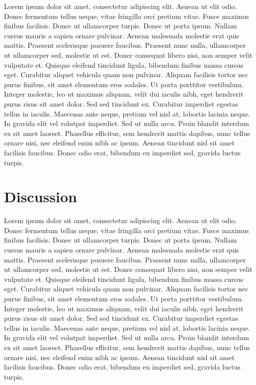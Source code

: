 \documentclass[Afour,times,sageh]{sagej}
\begin{document}
Lorem ipsum dolor sit amet, consectetur adipiscing elit. Aenean ut elit
odio. Donec fermentum tellus neque, vitae fringilla orci pretium vitae.
Fusce maximus finibus facilisis. Donec ut ullamcorper turpis. Donec ut
porta ipsum. Nullam cursus mauris a sapien ornare pulvinar. Aenean
malesuada molestie erat quis mattis. Praesent scelerisque posuere
faucibus. Praesent nunc nulla, ullamcorper ut ullamcorper sed, molestie
ut est. Donec consequat libero nisi, non semper velit vulputate et.
Quisque eleifend tincidunt ligula, bibendum finibus massa cursus eget.
Curabitur aliquet vehicula quam non pulvinar. Aliquam facilisis tortor
nec purus finibus, sit amet elementum eros sodales. Ut porta porttitor
vestibulum. Integer molestie, leo ut maximus aliquam, velit dui iaculis
nibh, eget hendrerit purus risus sit amet dolor. Sed sed tincidunt ex.
Curabitur imperdiet egestas tellus in iaculis. Maecenas ante neque,
pretium vel nisl at, lobortis lacinia neque. In gravida elit vel
volutpat imperdiet. Sed ut nulla arcu. Proin blandit interdum ex sit
amet laoreet. Phasellus efficitur, sem hendrerit mattis dapibus, nunc
tellus ornare nisi, nec eleifend enim nibh ac ipsum. Aenean tincidunt
nisl sit amet facilisis faucibus. Donec odio erat, bibendum eu imperdiet
sed, gravida luctus turpis.

\hypertarget{discussion}{%
\section{Discussion}\label{discussion}}

Lorem ipsum dolor sit amet, consectetur adipiscing elit. Aenean ut elit
odio. Donec fermentum tellus neque, vitae fringilla orci pretium vitae.
Fusce maximus finibus facilisis. Donec ut ullamcorper turpis. Donec ut
porta ipsum. Nullam cursus mauris a sapien ornare pulvinar. Aenean
malesuada molestie erat quis mattis. Praesent scelerisque posuere
faucibus. Praesent nunc nulla, ullamcorper ut ullamcorper sed, molestie
ut est. Donec consequat libero nisi, non semper velit vulputate et.
Quisque eleifend tincidunt ligula, bibendum finibus massa cursus eget.
Curabitur aliquet vehicula quam non pulvinar. Aliquam facilisis tortor
nec purus finibus, sit amet elementum eros sodales. Ut porta porttitor
vestibulum. Integer molestie, leo ut maximus aliquam, velit dui iaculis
nibh, eget hendrerit purus risus sit amet dolor. Sed sed tincidunt ex.
Curabitur imperdiet egestas tellus in iaculis. Maecenas ante neque,
pretium vel nisl at, lobortis lacinia neque. In gravida elit vel
volutpat imperdiet. Sed ut nulla arcu. Proin blandit interdum ex sit
amet laoreet. Phasellus efficitur, sem hendrerit mattis dapibus, nunc
tellus ornare nisi, nec eleifend enim nibh ac ipsum. Aenean tincidunt
nisl sit amet facilisis faucibus. Donec odio erat, bibendum eu imperdiet
sed, gravida luctus turpis.
\end{document}
